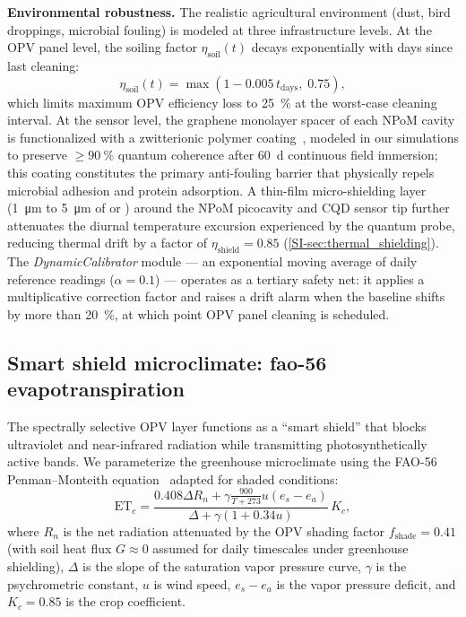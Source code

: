 \documentclass[onecolumn,a4paper,12pt]{article}
\begin{document}
\textbf{Environmental robustness.}
The realistic agricultural environment (dust, bird droppings, microbial fouling) is modeled at three infrastructure levels.
At the OPV panel level, the soiling factor $\eta_{\mathrm{soil}}(t)$ decays exponentially with days since last cleaning:
\begin{equation}
  \eta_{\mathrm{soil}}(t) = \max\!\left(1 - 0.005\,t_{\mathrm{days}},\; 0.75\right),
  \label{eq:soiling}
\end{equation}
which limits maximum OPV efficiency loss to \qty{25}{\percent} at the worst-case cleaning interval.
At the sensor level, the graphene monolayer spacer of each NPoM cavity is functionalized with a zwitterionic polymer coating~\cite{Kumar2022,Do2025}, modeled in our simulations to preserve $\geq\qty{90}{\percent}$ quantum coherence after \qty{60}{\day} continuous field immersion; this coating constitutes the primary anti-fouling barrier that physically repels microbial adhesion and protein adsorption. A thin-film micro-shielding layer (\qty{1}{\micro\meter} to \qty{5}{\micro\meter} of  or ) around the NPoM picocavity and CQD sensor tip further attenuates the diurnal temperature excursion experienced by the quantum probe, reducing thermal drift by a factor of $\eta_{\mathrm{shield}} = 0.85$ (\cref{SI-sec:thermal_shielding}). The \textit{DynamicCalibrator} module --- an exponential moving average of daily reference readings ($\alpha = 0.1$) --- operates as a tertiary safety net: it applies a multiplicative correction factor and raises a drift alarm when the baseline shifts by more than \qty{20}{\percent}, at which point OPV panel cleaning is scheduled.

\subsection*{Smart shield microclimate: fao-56 evapotranspiration}

The spectrally selective OPV layer functions as a ``smart shield'' that blocks ultraviolet and near-infrared radiation while transmitting photosynthetically active bands.
We parameterize the greenhouse microclimate using the FAO-56 Penman--Monteith equation~\cite{Allen1998} adapted for shaded conditions:
\begin{equation}
\mathrm{ET}_c = \frac{0.408 \Delta R_n + \gamma \frac{900}{T+273} u (e_s - e_a)}{\Delta + \gamma(1 + 0.34 u)} \, K_c,
\label{eq:fao56}
\end{equation}
where $R_n$ is the net radiation attenuated by the OPV shading factor $f_{\mathrm{shade}} = 0.41$ (with soil heat flux $G \approx 0$ assumed for daily timescales under greenhouse shielding), $\Delta$ is the slope of the saturation vapor pressure curve, $\gamma$ is the psychrometric constant, $u$ is wind speed, $e_s - e_a$ is the vapor pressure deficit, and $K_c = 0.85$ is the crop coefficient.
\end{document}
